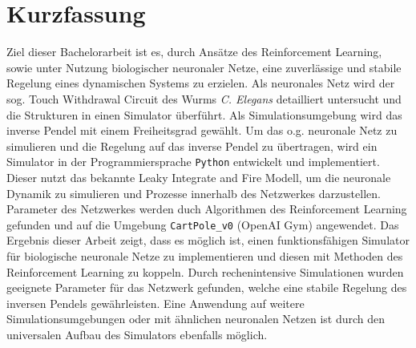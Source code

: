 \section*{Kurzfassung}
%
Ziel dieser Bachelorarbeit ist es, durch Ansätze des Reinforcement Learning, sowie unter Nutzung biologischer neuronaler Netze, eine zuverlässige und stabile Regelung eines dynamischen Systems zu erzielen. Als neuronales Netz wird der sog. \glqq Touch Withdrawal Circuit\grqq{} des Wurms \textit{C. Elegans} detailliert untersucht und die Strukturen in einen Simulator überführt. Als Simulationsumgebung wird das inverse Pendel mit einem Freiheitsgrad gewählt. Um das o.g. neuronale Netz zu simulieren und die Regelung auf das inverse Pendel zu übertragen, wird ein Simulator in der Programmiersprache \texttt{Python} entwickelt und implementiert. Dieser nutzt das bekannte Leaky Integrate and Fire Modell, um die neuronale Dynamik zu simulieren und Prozesse innerhalb des Netzwerkes darzustellen. Parameter des Netzwerkes werden duch Algorithmen des Reinforcement Learning gefunden und auf die Umgebung \texttt{CartPole\_v0} (OpenAI Gym) angewendet. Das Ergebnis dieser Arbeit zeigt, dass es möglich ist, einen funktionsfähigen Simulator für biologische neuronale Netze zu implementieren und diesen mit Methoden des Reinforcement Learning zu koppeln. Durch rechenintensive Simulationen wurden geeignete Parameter für das Netzwerk gefunden, welche eine stabile Regelung des inversen Pendels gewährleisten. Eine Anwendung auf weitere Simulationsumgebungen oder mit ähnlichen neuronalen Netzen ist durch den universalen Aufbau des Simulators ebenfalls möglich.

